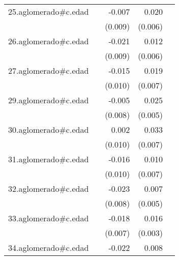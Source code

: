 {\begin{longtable}{l*{4}{D{.}{.}{-1}}}
\addlinespace
25.aglomerado#c.edad&                     &      -0.007         &       0.020\sym{**} &                     \\
            &                     &     (0.009)         &     (0.006)         &                     \\
\addlinespace
26.aglomerado#c.edad&                     &      -0.021\sym{*}  &       0.012\sym{*}  &                     \\
            &                     &     (0.009)         &     (0.006)         &                     \\
\addlinespace
27.aglomerado#c.edad&                     &      -0.015         &       0.019\sym{**} &                     \\
            &                     &     (0.010)         &     (0.007)         &                     \\
\addlinespace
29.aglomerado#c.edad&                     &      -0.005         &       0.025\sym{***}&                     \\
            &                     &     (0.008)         &     (0.005)         &                     \\
\addlinespace
30.aglomerado#c.edad&                     &       0.002         &       0.033\sym{***}&                     \\
            &                     &     (0.010)         &     (0.007)         &                     \\
\addlinespace
31.aglomerado#c.edad&                     &      -0.016         &       0.010         &                     \\
            &                     &     (0.010)         &     (0.007)         &                     \\
\addlinespace
32.aglomerado#c.edad&                     &      -0.023\sym{**} &       0.007         &                     \\
            &                     &     (0.008)         &     (0.005)         &                     \\
\addlinespace
33.aglomerado#c.edad&                     &      -0.018\sym{*}  &       0.016\sym{***}&                     \\
            &                     &     (0.007)         &     (0.003)         &                     \\
\addlinespace
34.aglomerado#c.edad&                     &      -0.022\sym{*}  &       0.008         &                     \\

\end{longtable}}
